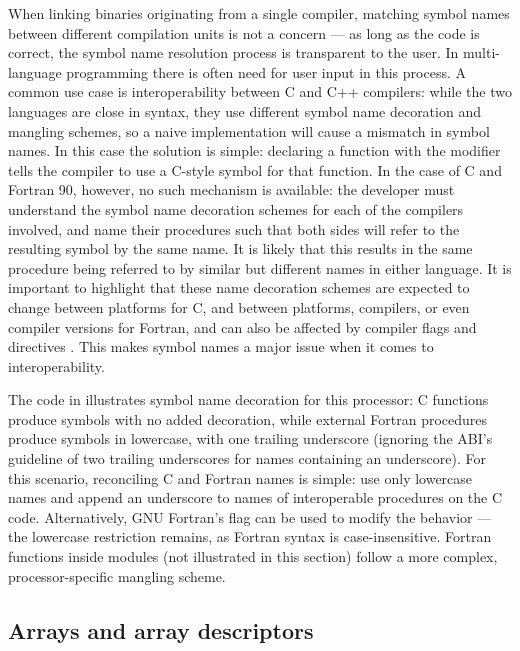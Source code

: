 When linking binaries originating from a single compiler, matching symbol names between different compilation units is not a concern --- as long as the code is correct, the symbol name resolution process is transparent to the user. In multi-language programming there is often need for user input in this process. A common use case is interoperability between C and C++ compilers: while the two languages are close in syntax, they use different symbol name decoration and mangling schemes, so a naive implementation will cause a mismatch in symbol names. In this case the solution is simple: declaring a function with the modifier  tells the compiler to use a C-style symbol for that function. In the case of C and Fortran 90, however, no such mechanism is available: the developer must understand the symbol name decoration schemes for each of the compilers involved, and name their procedures such that both sides will refer to the resulting symbol by the same name. It is likely that this results in the same procedure being referred to by similar but different names in either language. It is important to highlight that these name decoration schemes are expected to change between platforms for C, and between platforms, compilers, or even compiler versions for Fortran, and can also be affected by compiler flags and directives \cite{gfortranmanual}. This makes symbol names a major issue when it comes to interoperability.

The code in  illustrates symbol name decoration for this processor: C functions produce symbols with no added decoration, while external Fortran procedures produce symbols in lowercase, with one trailing underscore (ignoring the ABI's guideline \cite{x86_64_abi} of two trailing underscores for names containing an underscore). For this scenario, reconciling C and Fortran names is simple: use only lowercase names and append an underscore to names of interoperable procedures on the C code. Alternatively, GNU Fortran's  flag can be used to modify the behavior --- the lowercase restriction remains, as Fortran syntax is case-insensitive. Fortran functions inside modules (not illustrated in this section) follow a more complex, processor-specific mangling scheme.

\subsection{Arrays and array descriptors} \label{sec:interop_f90_arrays}

